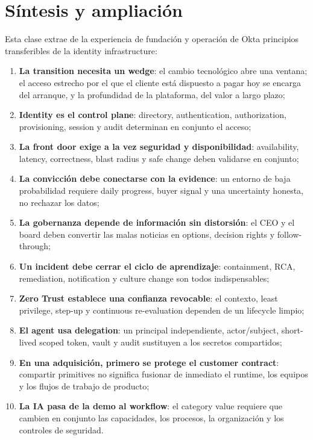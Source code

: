 \section{Síntesis y ampliación}

Esta clase extrae de la experiencia de fundación y operación de Okta principios transferibles de la identity infrastructure:

\begin{enumerate}
  \item \textbf{La transition necesita un wedge}: el cambio tecnológico abre una ventana; el acceso estrecho por el que el cliente está dispuesto a pagar hoy se encarga del arranque, y la profundidad de la plataforma, del valor a largo plazo;
  \item \textbf{Identity es el control plane}: directory, authentication, authorization, provisioning, session y audit determinan en conjunto el acceso;
  \item \textbf{La front door exige a la vez seguridad y disponibilidad}: availability, latency, correctness, blast radius y safe change deben validarse en conjunto;
  \item \textbf{La convicción debe conectarse con la evidence}: un entorno de baja probabilidad requiere daily progress, buyer signal y una uncertainty honesta, no rechazar los datos;
  \item \textbf{La gobernanza depende de información sin distorsión}: el CEO y el board deben convertir las malas noticias en options, decision rights y follow-through;
  \item \textbf{Un incident debe cerrar el ciclo de aprendizaje}: containment, RCA, remediation, notification y culture change son todos indispensables;
  \item \textbf{Zero Trust establece una confianza revocable}: el contexto, least privilege, step-up y continuous re-evaluation dependen de un lifecycle limpio;
  \item \textbf{El agent usa delegation}: un principal independiente, actor/subject, short-lived scoped token, vault y audit sustituyen a los secretos compartidos;
  \item \textbf{En una adquisición, primero se protege el customer contract}: compartir primitives no significa fusionar de inmediato el runtime, los equipos y los flujos de trabajo de producto;
  \item \textbf{La IA pasa de la demo al workflow}: el category value requiere que cambien en conjunto las capacidades, los procesos, la organización y los controles de seguridad.
\end{enumerate}

